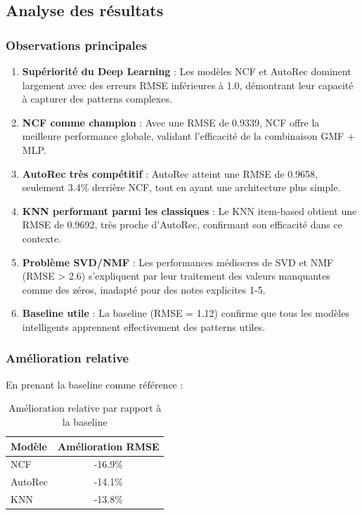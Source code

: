 \documentclass[12pt,a4paper]{article}
\begin{document}
\subsection{Analyse des résultats}

\subsubsection{Observations principales}

\begin{enumerate}
    \item \textbf{Supériorité du Deep Learning} : Les modèles NCF et AutoRec dominent largement avec des erreurs RMSE inférieures à 1.0, démontrant leur capacité à capturer des patterns complexes.
    
    \item \textbf{NCF comme champion} : Avec une RMSE de 0.9339, NCF offre la meilleure performance globale, validant l'efficacité de la combinaison GMF + MLP.
    
    \item \textbf{AutoRec très compétitif} : AutoRec atteint une RMSE de 0.9658, seulement 3.4\% derrière NCF, tout en ayant une architecture plus simple.
    
    \item \textbf{KNN performant parmi les classiques} : Le KNN item-based obtient une RMSE de 0.9692, très proche d'AutoRec, confirmant son efficacité dans ce contexte.
    
    \item \textbf{Problème SVD/NMF} : Les performances médiocres de SVD et NMF (RMSE > 2.6) s'expliquent par leur traitement des valeurs manquantes comme des zéros, inadapté pour des notes explicites 1-5.
    
    \item \textbf{Baseline utile} : La baseline (RMSE = 1.12) confirme que tous les modèles intelligents apprennent effectivement des patterns utiles.
\end{enumerate}

\subsubsection{Amélioration relative}

En prenant la baseline comme référence :

\begin{table}[H]
\centering
\begin{tabular}{@{}lc@{}}
\toprule
\textbf{Modèle} & \textbf{Amélioration RMSE} \\ \midrule
NCF & -16.9\% \\
AutoRec & -14.1\% \\
KNN & -13.8\% \\
\bottomrule
\end{tabular}
\caption{Amélioration relative par rapport à la baseline}
\end{table}
\end{document}
